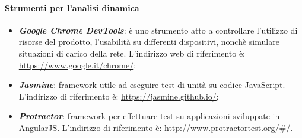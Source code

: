 	\paragraph{Strumenti per l'analisi dinamica}
		\begin{itemize}
			\item \textbf{\textit{Google Chrome DevTools}}: è uno strumento atto a controllare l'utilizzo di risorse del prodotto, l'usabilità su differenti dispositivi, nonchè simulare situazioni di carico della rete. L'indirizzo web di riferimento è: \url{https://www.google.it/chrome/};
			\item \textbf{\textit{Jasmine}}: framework utile ad eseguire test di unità su codice JavaScript. L'indirizzo di riferimento è: \url{https://jasmine.github.io/};
			\item \textbf{\textit{Protractor}}: framework per effettuare test su applicazioni sviluppate in AngularJS. L'indirizzo di riferimento è: \url{http://www.protractortest.org/#/}.
		\end{itemize}